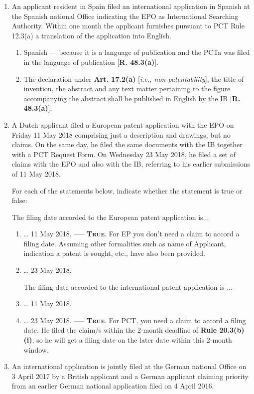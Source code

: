 \documentclass{report}
\begin{document}
\begin{enumerate}[label=\textbf{Answer \arabic*}]
    \item %
An applicant resident in Spain filed an international application in Spanish at the Spanish national Office indicating the EPO as International Searching Authority. Within one month the applicant furnishes pursuant to PCT Rule 12.3(a) a translation of the application into English.
    \begin{enumerate}[label=(\alph*)]
        \item  Spanish --- because it is a language of publication and the PCTa was filed in the language of publication [\textbf{R. 48.3(a)}].
\item  The declaration under \textbf{Art. 17.2(a)} [\textit{i.e., non-patentability}], the title of invention, the abstract and any text matter pertaining to the figure accompanying the abstract shall be published in English by the IB [\textbf{R. 48.3(a)}].
    \end{enumerate}

   \item %
A Dutch applicant filed a European patent application with the EPO on Friday 11 May 2018 comprising just a description and drawings, but no claims. On the same day, he filed the same documents with the IB together with a PCT Request Form. On Wednesday 23 May 2018, he filed a set of claims with the EPO and also with the IB, referring to his earlier submissions of 11 May 2018.


For each of the statements below, indicate whether the statement is true or false:

The filing date accorded to the European patent application is...


    \begin{enumerate}[label=(\alph*)]
        \item  … 11 May 2018. –––   \textbf{\textsc{True}}. For EP you don't need a claim to accord a filing date. Assuming other formalities such as name of Applicant, indication a patent is sought, etc., have also been provided.
\item … 23 May 2018. 
    
\vspace{0.5cm}

The filing date accorded to the international patent application is ...
 
        \item  … 11 May 2018.
\item … 23 May 2018. –––   \textbf{\textsc{True}}. For PCT, you need a claim to accord a filing date. He filed the claim/s within the 2-month deadline of \textbf{Rule 20.3(b)(i)}, so he will get a filing date on the later date within this 2-month window.
    \end{enumerate}
    \item %
An international application is jointly filed at the German national Office on 3 April 2017 by a British applicant and a German applicant claiming priority from an earlier German national application filed on 4 April 2016.



\end{enumerate}
\end{document}
